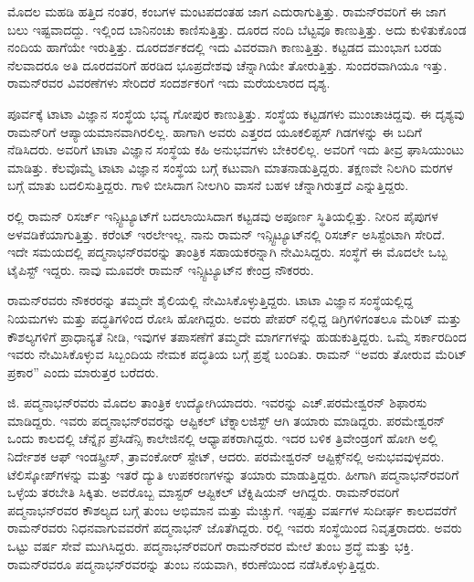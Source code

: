 ಮೊದಲ ಮಹಡಿ ಹತ್ತಿದ ನಂತರ, ಕಂಬಗಳ ಮಂಟಪದಂತಹ ಜಾಗ ಎದುರಾಗುತ್ತಿತ್ತು. ರಾಮನ್‍ರವರಿಗೆ ಈ ಜಾಗ ಬಲು ಇಷ್ಟವಾದದ್ದು. ಇಲ್ಲಿಂದ ಬಾನಿನಂಚು ಕಾಣಿಸುತ್ತಿತ್ತು. ದೂರದ ನಂದಿ ಬೆಟ್ಟವೂ ಕಾಣುತ್ತಿತ್ತು. ಅದು ಕುಳಿತುಕೊಂಡ ನಂದಿಯ ಹಾಗೆಯೇ ಇರುತ್ತಿತ್ತು. ದೂರದರ್ಶಕದಲ್ಲಿ ಇದು ವಿವರವಾಗಿ ಕಾಣುತ್ತಿತ್ತು. ಕಟ್ಟಡದ ಮುಂಭಾಗ ಬರಡು ನೆಲವಾದರೂ ಅತಿ ದೂರದವರಿಗೆ ಹರಡಿದ ಭೂಪ್ರದೇಶವು ಚೆನ್ನಾಗಿಯೇ ತೋರುತ್ತಿತ್ತು. ಸುಂದರವಾಗಿಯೂ ಇತ್ತು. ರಾಮನ್‍ರವರ ವಿವರಣೆಗಳು ಸೇರಿದರೆ ಸಂದರ್ಶಕರಿಗೆ ಇದು ಮರೆಯಲಾರದ ದೃಶ್ಯ.

ಪೂರ್ವಕ್ಕೆ ಟಾಟಾ ವಿಜ್ಞಾನ ಸಂಸ್ಥೆಯ ಭವ್ಯ ಗೋಪುರ ಕಾಣುತ್ತಿತ್ತು. ಸಂಸ್ಥೆಯ ಕಟ್ಟಡಗಳು ಮುಂಚಾಚಿದ್ದವು. ಈ ದೃಶ್ಯವು ರಾಮನ್‍ರಿಗೆ ಆಪ್ಯಾಯಮಾನವಾಗಿರಲಿಲ್ಲ. ಹಾಗಾಗಿ ಅವರು ಎತ್ತರದ ಯೂಕಲಿಪ್ಟಸ್ ಗಿಡಗಳನ್ನು ಈ ಬದಿಗೆ ನೆಡಿಸಿದರು. ಅವರಿಗೆ ಟಾಟಾ ವಿಜ್ಞಾನ ಸಂಸ್ಥೆಯ ಕಹಿ ಅನುಭವಗಳು ಬೇಕಿರಲಿಲ್ಲ. ಅವರಿಗೆ ಇದು ತೀವ್ರ ಘಾಸಿಯುಂಟು ಮಾಡಿತ್ತು. ಕೆಲವೊಮ್ಮೆ ಟಾಟಾ ವಿಜ್ಞಾನ ಸಂಸ್ಥೆಯ ಬಗ್ಗೆ ಕಟುವಾಗಿ ಮಾತನಾಡುತ್ತಿದ್ದರು. ತಕ್ಷಣವೇ ನಿಲಗಿರಿ ಮರಗಳ ಬಗ್ಗೆ ಮಾತು ಬದಲಿಸುತ್ತಿದ್ದರು. ಗಾಳಿ ಬೀಸಿದಾಗ ನೀಲಗಿರಿ ವಾಸನೆ ಬಹಳ ಚೆನ್ನಾಗಿರುತ್ತದೆ ಎನ್ನುತ್ತಿದ್ದರು.

ರಲ್ಲಿ ರಾಮನ್ ರಿಸರ್ಚ್ ಇನ್ಸ್ಟಿಟ್ಯೂಟ್‍ಗೆ ಬದಲಾಯಿಸಿದಾಗ ಕಟ್ಟಡವು ಅಪೂರ್ಣ ಸ್ಥಿತಿಯಲ್ಲಿತ್ತು. ನೀರಿನ ಪೈಪುಗಳ ಅಳವಡಿಕೆಯಾಗುತ್ತಿತ್ತು. ಕರೆಂಟ್ ಇರಲೇಇಲ್ಲ. ನಾನು ರಾಮನ್ ಇನ್ಸ್ಟಿಟ್ಯೂಟ್‍ನಲ್ಲಿ ರಿಸರ್ಚ್ ಅಸಿಸ್ಟೆಂಟಾಗಿ ಸೇರಿದೆ. ಇದೇ ಸಮಯದಲ್ಲಿ ಪದ್ಮನಾಭನ್‍ರವರನ್ನು ತಾಂತ್ರಿಕ ಸಹಾಯಕರನ್ನಾಗಿ ನೇಮಿಸಿದ್ದರು. ಸಂಸ್ಥೆಗೆ ಈ ಮೊದಲೇ ಒಬ್ಬ ಟೈಪಿಸ್ಟ್ ಇದ್ದರು. ನಾವು ಮೂವರೇ ರಾಮನ್ ಇನ್ಸ್ಟಿಟ್ಯೂಟ್‍ನ ಕೇಂದ್ರ ನೌಕರರು.

ರಾಮನ್‍ರವರು ನೌಕರರನ್ನು ತಮ್ಮದೇ ಶೈಲಿಯಲ್ಲಿ ನೇಮಿಸಿಕೊಳ್ಳುತ್ತಿದ್ದರು. ಟಾಟಾ ವಿಜ್ಞಾನ ಸಂಸ್ಥೆಯಲ್ಲಿದ್ದ ನಿಯಮಗಳು ಮತ್ತು ಪದ್ಧತಿಗಳಿಂದ ರೋಸಿ ಹೋಗಿದ್ದರು. ಅವರು ಪೇಪರ್ ನಲ್ಲಿದ್ದ ಡಿಗ್ರಿಗಳಿಗಂತಲೂ ಮೆರಿಟ್ ಮತ್ತು ಕೌಶಲ್ಯಗಳಿಗೆ ಪ್ರಾಧಾನ್ಯತೆ ನೀಡಿ, ಇವುಗಳ ತಪಾಸಣೆಗೆ ತಮ್ಮದೇ ಮಾರ್ಗಗಳನ್ನು ಹುಡುಕುತ್ತಿದ್ದರು. ಒಮ್ಮೆ ಸರ್ಕಾರದಿಂದ ಇವರು ನೇಮಿಸಿಕೊಳ್ಳುವ ಸಿಬ್ಬಂದಿಯ ನೇಮಕ ಪದ್ಧತಿಯ ಬಗ್ಗೆ ಪ್ರಶ್ನೆ ಬಂದಿತು. ರಾಮನ್ \enginline{-} “ಅವರು ತೋರುವ ಮೆರಿಟ್ ಪ್ರಕಾರ” ಎಂದು ಮಾರುತ್ತರ ಬರೆದರು.

ಜಿ. ಪದ್ಮನಾಭನ್‍ರವರು ಮೊದಲ ತಾಂತ್ರಿಕ ಉದ್ಯೋಗಿಯಾದರು. ಇವರನ್ನು ಎಚ್.\break ಪರಮೇಶ್ವರನ್ ಶಿಫಾರಸು ಮಾಡಿದ್ದರು. ಇವರು ಪದ್ಮನಾಭನ್‍ರವರನ್ನು ಆಪ್ಟಿಕಲ್ ಟೆಕ್ನಾಲಜಿಸ್ಟ್ ಆಗಿ ತಯಾರು ಮಾಡಿದ್ದರು. ಪರಮೇಶ್ವರನ್ ಒಂದು ಕಾಲದಲ್ಲಿ ಚೆನ್ನೈನ ಪ್ರೆಸಿಡೆನ್ಸಿ ಕಾಲೇಜಿನಲ್ಲಿ ಆಧ್ಯಾಪಕರಾಗಿದ್ದರು. ಇದರ ಬಳಿಕ ತ್ರಿವೇಂಡ್ರಂಗೆ ಹೋಗಿ ಅಲ್ಲಿ ನಿರ್ದೇಶಕ ಆಫ್ ಇಂಡಸ್ಟ್ರೀಸ್, ತ್ರಾವಂಕೋರ್ ಸ್ಟೇಟ್, ಆದರು. ಪರಮೇಶ್ವರನ್ ಆಪ್ಟಿಕ್ಸ್‌ನಲ್ಲಿ ಅನುಭವವುಳ್ಳವರು. ಟೆಲಿಸ್ಕೋಪ್‍ಗಳನ್ನು ಮತ್ತು ಇತರೆ ದ್ಯುತಿ ಉಪಕರಣಗಳನ್ನು ತಯಾರು ಮಾಡುತ್ತಿದ್ದರು. ಹೀಗಾಗಿ ಪದ್ಮನಾಭನ್‍ರವರಿಗೆ ಒಳ್ಳೆಯ ತರಬೇತಿ ಸಿಕ್ಕಿತು. ಅವರೊಬ್ಬ ಮಾಸ್ಟರ್ ಆಪ್ಟಿಕಲ್ ಟೆಕ್ನಿಷಿಯನ್ ಆಗಿದ್ದರು. ರಾಮನ್‍ರವರಿಗೆ ಪದ್ಮನಾಭನ್‍ರವರ ಕೌಶಲ್ಯದ ಬಗ್ಗೆ ತುಂಬ ಅಭಿಮಾನ ಮತ್ತು ಮೆಚ್ಚುಗೆ. ಇಪ್ಪತ್ತು ವರ್ಷಗಳ ಸುದೀರ್ಘ ಕಾಲದವರೆಗೆ ರಾಮನ್‍ರವರು ನಿಧನವಾಗುವವರೆಗೆ ಪದ್ಮನಾಭನ್ ಜೊತೆಗಿದ್ದರು. ರಲ್ಲಿ ಇವರು ಸಂಸ್ಥೆಯಿಂದ ನಿವೃತ್ತರಾದರು. ಅವರು ಒಟ್ಟು  ವರ್ಷ ಸೇವೆ ಮುಗಿಸಿದ್ದರು. ಪದ್ಮನಾಭನ್‍ರವರಿಗೆ ರಾಮನ್‍ರವರ ಮೇಲೆ ತುಂಬ ಶ್ರದ್ಧೆ ಮತ್ತು ಭಕ್ತಿ. ರಾಮನ್‍ರವರೂ ಪದ್ಮನಾಭನ್‍ರವರನ್ನು ತುಂಬ ನಯವಾಗಿ, ಕರುಣೆಯಿಂದ ನಡೆಸಿಕೊಳ್ಳುತ್ತಿದ್ದರು.

